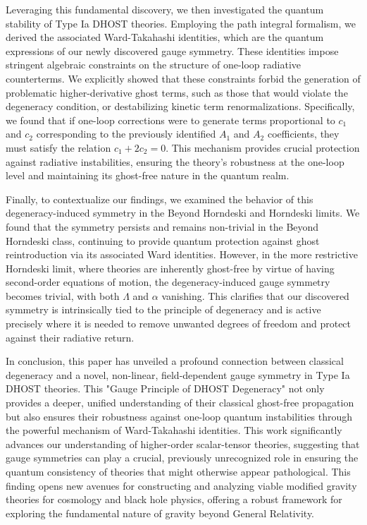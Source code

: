 \documentclass[twocolumn]{aastex631}
\begin{document}
Leveraging this fundamental discovery, we then investigated the quantum stability of Type Ia DHOST theories. Employing the path integral formalism, we derived the associated Ward-Takahashi identities, which are the quantum expressions of our newly discovered gauge symmetry. These identities impose stringent algebraic constraints on the structure of one-loop radiative counterterms. We explicitly showed that these constraints forbid the generation of problematic higher-derivative ghost terms, such as those that would violate the degeneracy condition, or destabilizing kinetic term renormalizations. Specifically, we found that if one-loop corrections were to generate terms proportional to $c_1$ and $c_2$ corresponding to the previously identified $A_1$ and $A_2$ coefficients, they must satisfy the relation $c_1 + 2c_2 = 0$. This mechanism provides crucial protection against radiative instabilities, ensuring the theory's robustness at the one-loop level and maintaining its ghost-free nature in the quantum realm.

Finally, to contextualize our findings, we examined the behavior of this degeneracy-induced symmetry in the Beyond Horndeski and Horndeski limits. We found that the symmetry persists and remains non-trivial in the Beyond Horndeski class, continuing to provide quantum protection against ghost reintroduction via its associated Ward identities. However, in the more restrictive Horndeski limit, where theories are inherently ghost-free by virtue of having second-order equations of motion, the degeneracy-induced gauge symmetry becomes trivial, with both $\Lambda$ and $\alpha$ vanishing. This clarifies that our discovered symmetry is intrinsically tied to the principle of degeneracy and is active precisely where it is needed to remove unwanted degrees of freedom and protect against their radiative return.

In conclusion, this paper has unveiled a profound connection between classical degeneracy and a novel, non-linear, field-dependent gauge symmetry in Type Ia DHOST theories. This "Gauge Principle of DHOST Degeneracy" not only provides a deeper, unified understanding of their classical ghost-free propagation but also ensures their robustness against one-loop quantum instabilities through the powerful mechanism of Ward-Takahashi identities. This work significantly advances our understanding of higher-order scalar-tensor theories, suggesting that gauge symmetries can play a crucial, previously unrecognized role in ensuring the quantum consistency of theories that might otherwise appear pathological. This finding opens new avenues for constructing and analyzing viable modified gravity theories for cosmology and black hole physics, offering a robust framework for exploring the fundamental nature of gravity beyond General Relativity.

{}

\end{document}
